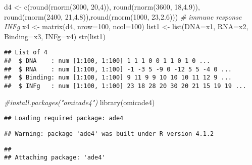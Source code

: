 \documentclass[
]{article}
\newenvironment{Shaded}{\begin{snugshade}}{\end{snugshade}}
\newcommand{\AttributeTok}[1]{\textcolor[rgb]{0.77,0.63,0.00}{#1}}
\newcommand{\CommentTok}[1]{\textcolor[rgb]{0.56,0.35,0.01}{\textit{#1}}}
\newcommand{\DecValTok}[1]{\textcolor[rgb]{0.00,0.00,0.81}{#1}}
\newcommand{\FloatTok}[1]{\textcolor[rgb]{0.00,0.00,0.81}{#1}}
\newcommand{\FunctionTok}[1]{\textcolor[rgb]{0.00,0.00,0.00}{#1}}
\newcommand{\NormalTok}[1]{#1}
\newcommand{\OtherTok}[1]{\textcolor[rgb]{0.56,0.35,0.01}{#1}}
\begin{document}
\begin{Shaded}
\begin{Highlighting}[]
\NormalTok{d4 }\OtherTok{\textless{}{-}} \FunctionTok{c}\NormalTok{(}\FunctionTok{round}\NormalTok{(}\FunctionTok{rnorm}\NormalTok{(}\DecValTok{3000}\NormalTok{, }\DecValTok{20}\NormalTok{,}\DecValTok{4}\NormalTok{)),  }\FunctionTok{round}\NormalTok{(}\FunctionTok{rnorm}\NormalTok{(}\DecValTok{3600}\NormalTok{, }\DecValTok{18}\NormalTok{,}\FloatTok{4.9}\NormalTok{)),}
        \FunctionTok{round}\NormalTok{(}\FunctionTok{rnorm}\NormalTok{(}\DecValTok{2400}\NormalTok{, }\DecValTok{21}\NormalTok{,}\FloatTok{4.8}\NormalTok{)),}\FunctionTok{round}\NormalTok{(}\FunctionTok{rnorm}\NormalTok{(}\DecValTok{1000}\NormalTok{, }\DecValTok{23}\NormalTok{,}\FloatTok{2.6}\NormalTok{)))}
      \CommentTok{\# immune response INFg}
\NormalTok{x4 }\OtherTok{\textless{}{-}} \FunctionTok{matrix}\NormalTok{(d4, }\AttributeTok{nrow=}\DecValTok{100}\NormalTok{, }\AttributeTok{ncol=}\DecValTok{100}\NormalTok{)}
\NormalTok{list1 }\OtherTok{\textless{}{-}} \FunctionTok{list}\NormalTok{(}\AttributeTok{DNA=}\NormalTok{x1, }\AttributeTok{RNA=}\NormalTok{x2, }\AttributeTok{Binding=}\NormalTok{x3, }\AttributeTok{INFg=}\NormalTok{x4)}
\FunctionTok{str}\NormalTok{(list1)}
\end{Highlighting}
\end{Shaded}

\begin{verbatim}
## List of 4
##  $ DNA    : num [1:100, 1:100] 1 1 1 0 0 1 1 0 1 0 ...
##  $ RNA    : num [1:100, 1:100] -1 -3 5 -9 0 -12 5 5 -4 0 ...
##  $ Binding: num [1:100, 1:100] 9 11 9 9 10 10 10 11 12 9 ...
##  $ INFg   : num [1:100, 1:100] 23 18 28 20 30 20 21 15 19 19 ...
\end{verbatim}

\begin{Shaded}
\begin{Highlighting}[]
\CommentTok{\#install.packages("omicade4")}
\FunctionTok{library}\NormalTok{(omicade4)}
\end{Highlighting}
\end{Shaded}

\begin{verbatim}
## Loading required package: ade4
\end{verbatim}

\begin{verbatim}
## Warning: package 'ade4' was built under R version 4.1.2
\end{verbatim}

\begin{verbatim}
## 
## Attaching package: 'ade4'
\end{verbatim}
\end{document}
